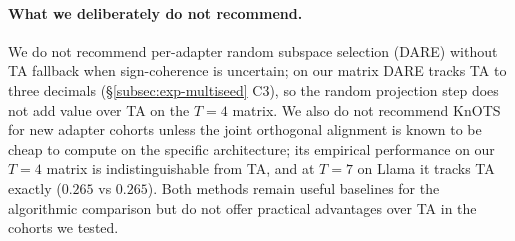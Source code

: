 \paragraph{What we deliberately do not recommend.}
We do not recommend per-adapter random subspace selection (DARE)
without TA fallback when sign-coherence is uncertain; on our matrix
DARE tracks TA to three decimals (\S\ref{subsec:exp-multiseed} C3),
so the random projection step does not add value over TA on the
$T = 4$ matrix. We also do not recommend KnOTS for new adapter
cohorts unless the joint orthogonal alignment is known to be cheap
to compute on the specific architecture; its empirical performance
on our $T = 4$ matrix is indistinguishable from TA, and at $T = 7$
on Llama it tracks TA exactly ($0.265$ vs $0.265$). Both methods
remain useful baselines for the algorithmic comparison but do not
offer practical advantages over TA in the cohorts we tested.

